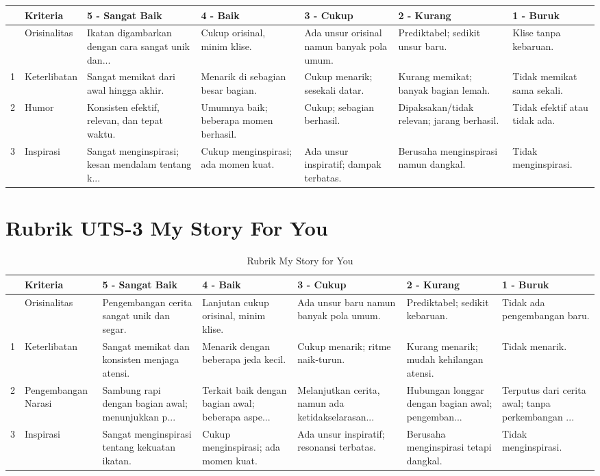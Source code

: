 \documentclass[
  letterpaper,
  DIV=11,
  numbers=noendperiod]{scrreprt}
\begin{document}
\begin{landscape}
\begin{longtable}[]{@{}lllllll@{}}
\tabularnewline

\toprule\noalign{}
& Kriteria & 5 - Sangat Baik & 4 - Baik & 3 - Cukup & 2 - Kurang & 1 -
Buruk \\
\midrule\noalign{}
\endhead
\bottomrule\noalign{}
\endlastfoot
0 & Orisinalitas & Ikatan digambarkan dengan cara sangat unik dan... &
Cukup orisinal, minim klise. & Ada unsur orisinal namun banyak pola
umum. & Prediktabel; sedikit unsur baru. & Klise tanpa kebaruan. \\
1 & Keterlibatan & Sangat memikat dari awal hingga akhir. & Menarik di
sebagian besar bagian. & Cukup menarik; sesekali datar. & Kurang
memikat; banyak bagian lemah. & Tidak memikat sama sekali. \\
2 & Humor & Konsisten efektif, relevan, dan tepat waktu. & Umumnya baik;
beberapa momen berhasil. & Cukup; sebagian berhasil. & Dipaksakan/tidak
relevan; jarang berhasil. & Tidak efektif atau tidak ada. \\
3 & Inspirasi & Sangat menginspirasi; kesan mendalam tentang k... &
Cukup menginspirasi; ada momen kuat. & Ada unsur inspiratif; dampak
terbatas. & Berusaha menginspirasi namun dangkal. & Tidak
menginspirasi. \\

\end{longtable}

\chapter{Rubrik UTS-3 My Story For
You}\label{rubrik-uts-3-my-story-for-you}

\begin{longtable}[]{@{}lllllll@{}}

\caption{\label{tbl-rubric_uts-3}Rubrik My Story for You}

\tabularnewline

\toprule\noalign{}
& Kriteria & 5 - Sangat Baik & 4 - Baik & 3 - Cukup & 2 - Kurang & 1 -
Buruk \\
\midrule\noalign{}
\endhead
\bottomrule\noalign{}
\endlastfoot
0 & Orisinalitas & Pengembangan cerita sangat unik dan segar. & Lanjutan
cukup orisinal, minim klise. & Ada unsur baru namun banyak pola umum. &
Prediktabel; sedikit kebaruan. & Tidak ada pengembangan baru. \\
1 & Keterlibatan & Sangat memikat dan konsisten menjaga atensi. &
Menarik dengan beberapa jeda kecil. & Cukup menarik; ritme naik-turun. &
Kurang menarik; mudah kehilangan atensi. & Tidak menarik. \\
2 & Pengembangan Narasi & Sambung rapi dengan bagian awal; menunjukkan
p... & Terkait baik dengan bagian awal; beberapa aspe... & Melanjutkan
cerita, namun ada ketidakselarasan... & Hubungan longgar dengan bagian
awal; pengemban... & Terputus dari cerita awal; tanpa perkembangan
... \\
3 & Inspirasi & Sangat menginspirasi tentang kekuatan ikatan. & Cukup
menginspirasi; ada momen kuat. & Ada unsur inspiratif; resonansi
terbatas. & Berusaha menginspirasi tetapi dangkal. & Tidak
menginspirasi. \\


\end{longtable}
\end{landscape}
\end{document}
